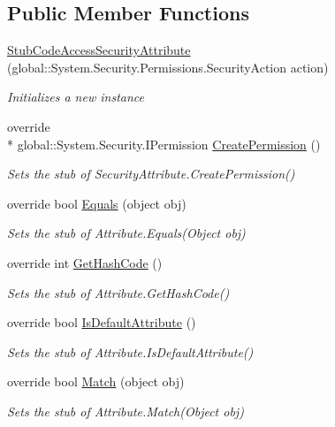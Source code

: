 \subsection*{Public Member Functions}
\begin{DoxyCompactItemize}
\item 
\hyperlink{class_system_1_1_security_1_1_permissions_1_1_fakes_1_1_stub_code_access_security_attribute_a2633943fd76c057249ea3963fd044ada}{Stub\-Code\-Access\-Security\-Attribute} (global\-::\-System.\-Security.\-Permissions.\-Security\-Action action)
\begin{DoxyCompactList}\small\item\em Initializes a new instance\end{DoxyCompactList}\item 
override \\*
global\-::\-System.\-Security.\-I\-Permission \hyperlink{class_system_1_1_security_1_1_permissions_1_1_fakes_1_1_stub_code_access_security_attribute_aebb174fd242210d5a3d199cc6d247b72}{Create\-Permission} ()
\begin{DoxyCompactList}\small\item\em Sets the stub of Security\-Attribute.\-Create\-Permission()\end{DoxyCompactList}\item 
override bool \hyperlink{class_system_1_1_security_1_1_permissions_1_1_fakes_1_1_stub_code_access_security_attribute_ae9f5686d0c76aa6449b8feb10717b272}{Equals} (object obj)
\begin{DoxyCompactList}\small\item\em Sets the stub of Attribute.\-Equals(\-Object obj)\end{DoxyCompactList}\item 
override int \hyperlink{class_system_1_1_security_1_1_permissions_1_1_fakes_1_1_stub_code_access_security_attribute_a68cca68335b8a0676ad884b6957e6c9c}{Get\-Hash\-Code} ()
\begin{DoxyCompactList}\small\item\em Sets the stub of Attribute.\-Get\-Hash\-Code()\end{DoxyCompactList}\item 
override bool \hyperlink{class_system_1_1_security_1_1_permissions_1_1_fakes_1_1_stub_code_access_security_attribute_a69177d1d0c61a57747ac4fbae5bfb549}{Is\-Default\-Attribute} ()
\begin{DoxyCompactList}\small\item\em Sets the stub of Attribute.\-Is\-Default\-Attribute()\end{DoxyCompactList}\item 
override bool \hyperlink{class_system_1_1_security_1_1_permissions_1_1_fakes_1_1_stub_code_access_security_attribute_a536a7d3db8cb41616e99066b32ff3ffb}{Match} (object obj)
\begin{DoxyCompactList}\small\item\em Sets the stub of Attribute.\-Match(\-Object obj)\end{DoxyCompactList}\end{DoxyCompactItemize}
